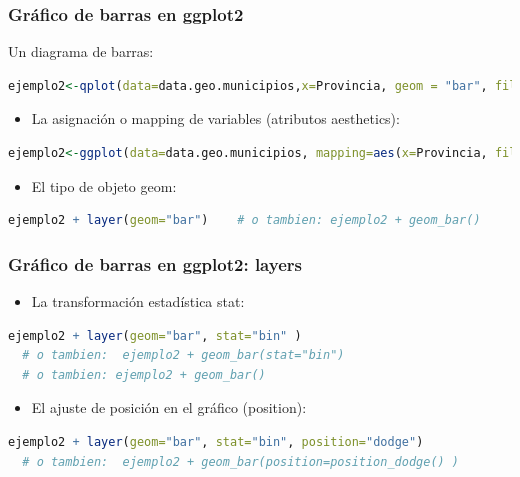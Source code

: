 \documentclass[8pt,ignorenonframetext,]{beamer}
\begin{document}
\begin{frame}[fragile]\frametitle{Gráfico de barras en ggplot2}

Un diagrama de barras:

\begin{lstlisting}[language=R]
ejemplo2<-qplot(data=data.geo.municipios,x=Provincia, geom = "bar", fill = Isla)
\end{lstlisting}

\begin{itemize}
\itemsep1pt\parskip0pt
\item
  La asignación o mapping de variables (atributos aesthetics):
\end{itemize}

\begin{lstlisting}[language=R]
  ejemplo2<-ggplot(data=data.geo.municipios, mapping=aes(x=Provincia, fill=Isla))
\end{lstlisting}

\begin{itemize}
\itemsep1pt\parskip0pt
\item
  El tipo de objeto geom:
\end{itemize}

\begin{lstlisting}[language=R]
  ejemplo2 + layer(geom="bar")    # o tambien: ejemplo2 + geom_bar()  
\end{lstlisting}

\end{frame}

\begin{frame}[fragile]\frametitle{Gráfico de barras en ggplot2: layers}

\begin{itemize}
\itemsep1pt\parskip0pt
\item
  La transformación estadística stat:
\end{itemize}

\begin{lstlisting}[language=R]
  ejemplo2 + layer(geom="bar", stat="bin" )  
  # o tambien:  ejemplo2 + geom_bar(stat="bin")  
  # o tambien: ejemplo2 + geom_bar()
\end{lstlisting}

\begin{itemize}
\itemsep1pt\parskip0pt
\item
  El ajuste de posición en el gráfico (position):
\end{itemize}

\begin{lstlisting}[language=R]
  ejemplo2 + layer(geom="bar", stat="bin", position="dodge")  
  # o tambien:  ejemplo2 + geom_bar(position=position_dodge() )   
\end{lstlisting}

\end{frame}
\end{document}
